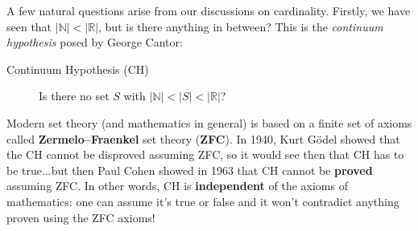 \documentclass[11pt,dvipsnames]{book}
\def\R{\mathbb{R}}
\def\N{{\mathbb{N}}}
\numberwithin{equation}{section} %
\numberwithin{figure}{section} %
\numberwithin{table}{section} %
\begin{document}
A few natural questions arise from our discussions on cardinality. Firstly, we have seen that $|\N|<|\R|$, but is there anything in between? This is the {\it continuum hypothesis} posed by George Cantor:\\

\begin{description}
\item[Continuum Hypothesis (CH)] Is there no set $S$ with $|\mathbb{N}|<|S|<|\mathbb{R}|$?\\
\end{description}


Modern set theory (and mathematics in general) is based on a finite set of axioms called {\bf Zermelo--Fraenkel} set theory ({\bf ZFC}). In 1940, Kurt G\"odel showed that the CH cannot be disproved assuming ZFC, so it would see then that CH has to be true...but then Paul Cohen showed in 1963 that CH cannot be {\bf proved} assuming ZFC. In other words, CH is {\bf independent} of the axioms of mathematics: one can assume it's true or false and it won't contradict anything proven using the ZFC axioms!



%


%
%
%
%
%
%
%
%
\end{document}
